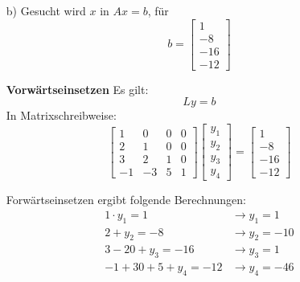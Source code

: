 \documentclass[11pt]{article}
\theoremstyle{plain}
\theoremstyle{definition}
\renewcommand{\a}{\"{a}}
\renewcommand{\u}{\"{u}}
\begin{document}
\begin{itemize}
\item[b)]
Gesucht wird $x$ in $Ax=b$, f\u r
\begin{equation}
b = 
\begin{bmatrix}
1 \\ -8 \\ -16 \\ -12
\end{bmatrix}
\end{equation}


\textbf{Vorw\a rtseinsetzen}
Es gilt:
\begin{equation}
Ly=b
\end{equation}
In Matrixschreibweise:
\begin{equation}
\begin{bmatrix}
1 & 0 & 0 & 0 \\
2 & 1 & 0 & 0 \\
3 & 2 & 1 & 0 \\
-1& -3& 5 & 1
\end{bmatrix}
\begin{bmatrix}
y_1 \\ y_2 \\ y_3 \\ y_4
\end{bmatrix}
=
\begin{bmatrix}
1 \\ -8 \\ -16 \\ -12
\end{bmatrix}
\end{equation}

Forw\a rtseinsetzen ergibt folgende Berechnungen:
\begin{align}
1 \cdot y_1 = 1   &\rightarrow y_1 = 1 \\
2 + y_2 = -8      &\rightarrow y_2=-10 \\
3-20+y_3 =-16     &\rightarrow y_3 = 1 \\
-1+30+5+y_4 = -12 &\rightarrow y_4 = -46 \\
\end{align}
 

\end{itemize}
\end{document}
